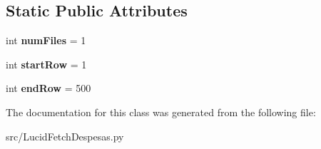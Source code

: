 \subsection*{Static Public Attributes}
\begin{DoxyCompactItemize}
\item 
\hypertarget{classLucidFetchDespesas_1_1LucidFetchDespesas_ae64548280cd4c305eedfad9ff7cf7b77}{
int {\bfseries numFiles} = 1}
\label{classLucidFetchDespesas_1_1LucidFetchDespesas_ae64548280cd4c305eedfad9ff7cf7b77}

\item 
\hypertarget{classLucidFetchDespesas_1_1LucidFetchDespesas_afff69bba583f76238aa1472a44f13bb1}{
int {\bfseries startRow} = 1}
\label{classLucidFetchDespesas_1_1LucidFetchDespesas_afff69bba583f76238aa1472a44f13bb1}

\item 
\hypertarget{classLucidFetchDespesas_1_1LucidFetchDespesas_a1b4d82e2a98307334081269d4b202e07}{
int {\bfseries endRow} = 500}
\label{classLucidFetchDespesas_1_1LucidFetchDespesas_a1b4d82e2a98307334081269d4b202e07}

\end{DoxyCompactItemize}


The documentation for this class was generated from the following file:\begin{DoxyCompactItemize}
\item 
src/LucidFetchDespesas.py\end{DoxyCompactItemize}
